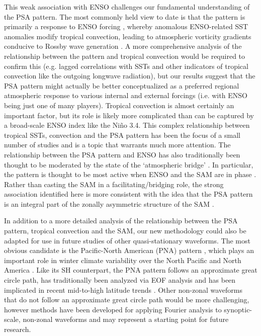 This weak association with ENSO challenges our fundamental understanding of the PSA pattern. The most commonly held view to date is that the pattern is primarily a response to ENSO forcing \citep[e.g.][]{Mo2001}, whereby anomalous ENSO-related SST anomalies modify tropical convection, leading to atmospheric vorticity gradients conducive to Rossby wave generation \citep{Sardeshmukh1988}. A more comprehensive analysis of the relationship between the pattern and tropical convection would be required to confirm this (e.g. lagged correlations with SSTs and other indicators of tropical convection like the outgoing longwave radiation), but our results suggest that the PSA pattern might actually be better conceptualized as a preferred regional atmospheric response to various internal and external forcings (i.e. with ENSO being just one of many players). Tropical convection is almost certainly an important factor, but its role is likely more complicated than can be captured by a broad-scale ENSO index like the Ni\~{n}o 3.4. This complex relationship between tropical SSTs, convection and the PSA pattern has been the focus of a small number of studies \citep[e.g.][]{Harangozo2004,LachlanCope2006} and is a topic that warrants much more attention. The relationship between the PSA pattern and ENSO has also traditionally been thought to be moderated by the state of the `atmospheric bridge' \citep{Liu2007}. In particular, the pattern is thought to be most active when ENSO and the SAM are in phase \citep{Fogt2006}. Rather than casting the SAM in a facilitating/bridging role, the strong association identified here is more consistent with the idea that the PSA pattern is an integral part of the zonally asymmetric structure of the SAM \citep[e.g.][]{Ding2012,Fogt2012}. 

In addition to a more detailed analysis of the relationship between the PSA pattern, tropical convection and the SAM, our new methodology could also be adapted for use in future studies of other quasi-stationary waveforms. The most obvious candidate is the Pacific-North American (PNA) pattern \citep{Wallace1981}, which plays an important role in winter climate variability over the North Pacific and North America \citep[e.g.][]{Notaro2006}. Like its SH counterpart, the PNA pattern follows an approximate great circle path, has traditionally been analyzed via EOF analysis and has been implicated in recent mid-to-high latitude trends \citep[e.g.][]{Ding2014,Liu2015}. Other non-zonal waveforms that do not follow an approximate great circle path would be more challenging, however methods have been developed for applying Fourier analysis to synoptic-scale, non-zonal waveforms \citep{Zimin2006,Souders2014} and may represent a starting point for future research. 
